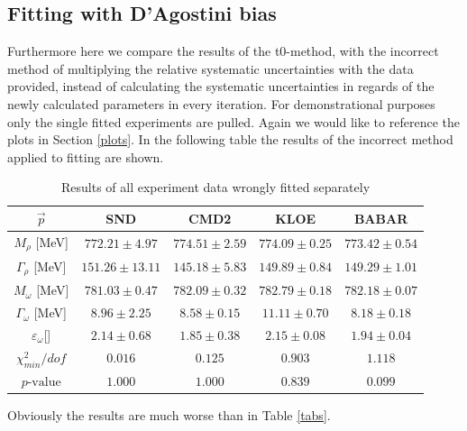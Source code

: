 \documentclass[a4paper]{article}
\begin{document}
\subsection{Fitting with D'Agostini bias}
Furthermore here we compare the results of the t0-method, with the incorrect method of
multiplying the relative systematic uncertainties with the data provided, instead of
calculating the systematic uncertainties in regards of the newly calculated parameters in
every iteration. For demonstrational purposes only the single fitted experiments are pulled.
Again we would like to reference the plots in Section \ref{plots}. In the following table
the results of the incorrect method applied to fitting are shown.

\begin{table}[h!]
    \caption{Results of all experiment data wrongly fitted  separately}
    \centering
    \begin{tabular}{|c|c|c|c|c|}
        \hline
        $\vec{p}$ & SND & CMD2 & KLOE & BABAR \\ \hline
        $M_{\rho}$   [MeV]           & $772.21	\pm 4.97$ & $774.51	\pm 2.59$ &$774.09	\pm 0.25 $&$773.42 \pm 0.54$ \\
        $\Gamma_{\rho}$   [MeV]      & $151.26	\pm 13.11$ & $145.18	\pm 5.83$ &$149.89	\pm 0.84 $&$149.29	\pm 1.01$\\
        $M_{\omega}$      [MeV]      & $781.03	\pm 0.47$ & $782.09	\pm 0.32$ &$782.79	\pm 0.18 $&$782.18	\pm 0.07$\\
        $\Gamma_{\omega}$  [MeV]     & $8.96	\pm 2.25    $ & $8.58	\pm 0.15$ &$11.11	\pm 0.70 $&$8.18	\pm 0.18$\\
        $\varepsilon_{\omega}$[]  & $2.14	\pm 0.68    $ & $1.85	\pm 0.38$ &$2.15	\pm 0.08 $&$1.94	\pm 0.04$\\
        \hline \hline
        $\chi^2_{min}/dof$      & $0.016$&$ 0.125$&$ 0.903$&$ 1.118$\\
        $p\text{-value}$        & $1.000$&$ 1.000$&$ 0.839$&$ 0.099$\\
        \hline
    \end{tabular}
\end{table}

Obviously the results are much worse than in Table \ref{tabs}.
\end{document}
